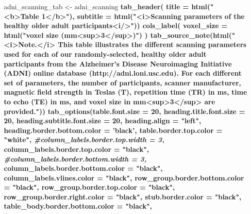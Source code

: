\documentclass[
]{article}
\newenvironment{Shaded}{\begin{snugshade}}{\end{snugshade}}
\newcommand{\CommentTok}[1]{\textcolor[rgb]{0.56,0.35,0.01}{\textit{#1}}}
\newcommand{\DataTypeTok}[1]{\textcolor[rgb]{0.13,0.29,0.53}{#1}}
\newcommand{\DecValTok}[1]{\textcolor[rgb]{0.00,0.00,0.81}{#1}}
\newcommand{\KeywordTok}[1]{\textcolor[rgb]{0.13,0.29,0.53}{\textbf{#1}}}
\newcommand{\NormalTok}[1]{#1}
\newcommand{\OperatorTok}[1]{\textcolor[rgb]{0.81,0.36,0.00}{\textbf{#1}}}
\newcommand{\StringTok}[1]{\textcolor[rgb]{0.31,0.60,0.02}{#1}}
\begin{document}
\begin{Shaded}
\begin{Highlighting}[]
\NormalTok{adni_scanning_tab <-}\StringTok{ }\NormalTok{adni_scanning }\OperatorTok{%>%}\StringTok{ }\KeywordTok{gt}\NormalTok{() }\OperatorTok{%>%}
\KeywordTok{tab_header}\NormalTok{(}
  \DataTypeTok{title =} \KeywordTok{html}\NormalTok{(}\StringTok{"<b>Table 1</b>"}\NormalTok{),}
  \DataTypeTok{subtitle =} \KeywordTok{html}\NormalTok{(}\StringTok{"<i>Scanning parameters of the healthy older adult participants<i/>"}\NormalTok{)) }\OperatorTok{%>%}
\StringTok{ }
\StringTok{  }\KeywordTok{cols_label}\NormalTok{(}
    \DataTypeTok{voxel_size =} \KeywordTok{html}\NormalTok{(}\StringTok{"voxel size (mm<sup>3</sup>)"}\NormalTok{) }
\NormalTok{    ) }\OperatorTok{%>%}
\KeywordTok{tab_source_note}\NormalTok{(}\KeywordTok{html}\NormalTok{(}\StringTok{"<i>Note.</i> This table illustrates the different scanning parameters used for each of our randomly-selected, healthy older adult participants from the Alzheimer's Disease Neuroimaging Initiative (ADNI) online database (http://adni.loni.usc.edu). For each different set of parameters, the number of participants, scanner manufacturer, magnetic field strength in Teslas (T), repetition time (TR) in ms, time to echo (TE) in ms, and voxel size in mm<sup>3</sup> are provided."}\NormalTok{)) }\OperatorTok{%>%}
\StringTok{  }\KeywordTok{tab_options}\NormalTok{(}\DataTypeTok{table.font.size =} \DecValTok{20}\NormalTok{,}
    \DataTypeTok{heading.title.font.size =} \DecValTok{20}\NormalTok{,}
    \DataTypeTok{heading.subtitle.font.size =} \DecValTok{20}\NormalTok{,}
    \DataTypeTok{heading.align =} \StringTok{"left"}\NormalTok{,}
    \DataTypeTok{heading.border.bottom.color =} \StringTok{'black'}\NormalTok{,}
    \DataTypeTok{table.border.top.color =} \StringTok{"white"}\NormalTok{,}
    \CommentTok{#column_labels.border.top.width = 3,}
    \DataTypeTok{column_labels.border.top.color =} \StringTok{"black"}\NormalTok{,}
    \CommentTok{#column_labels.border.bottom.width = 3,}
    \DataTypeTok{column_labels.border.bottom.color =} \StringTok{"black"}\NormalTok{,}
    \DataTypeTok{column_labels.vlines.color =} \StringTok{"black"}\NormalTok{,}
    \DataTypeTok{row_group.border.bottom.color =} \StringTok{"black"}\NormalTok{,}
    \DataTypeTok{row_group.border.top.color =} \StringTok{"black"}\NormalTok{,}
    \DataTypeTok{row_group.border.right.color =} \StringTok{"black"}\NormalTok{,}
    \DataTypeTok{stub.border.color =} \StringTok{"black"}\NormalTok{,}
    \DataTypeTok{table_body.border.bottom.color =} \StringTok{"black"}\NormalTok{,}
}}}}
\end{Highlighting}
\end{Shaded}
\end{document}
